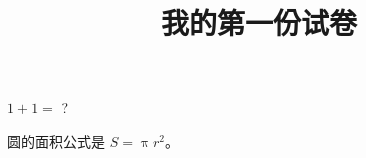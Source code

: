 \documentclass{exam-zh}
\begin{document}
\title{我的第一份试卷}
\maketitle

\begin{question}
  $1 + 1 = $ ?
\end{question}

\begin{question}
  圆的面积公式是 $ S = \uppi r^2 $。
\end{question}
\end{document}
